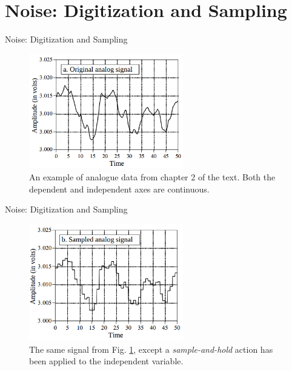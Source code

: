 \documentclass{beamer}
\begin{document}
\section{Noise: Digitization and Sampling}

\begin{frame}[fragile]{Noise: Digitization and Sampling}
\begin{figure}
\centering
\includegraphics[width=0.6\textwidth]{figures/adc_dac1.png}
\caption{\label{fig:adc1} An example of analogue data from chapter 2 of the text.  Both the dependent and independent axes are continuous.}
\end{figure}
\end{frame}

\begin{frame}[fragile]{Noise: Digitization and Sampling}
\begin{figure}
\centering
\includegraphics[width=0.6\textwidth]{figures/adc_dac2.png}
\caption{\label{fig:adc2} The same signal from Fig. \ref{fig:adc1}, except a \textit{sample-and-hold} action has been applied to the independent variable.}
\end{figure}
\end{frame}
\end{document}
